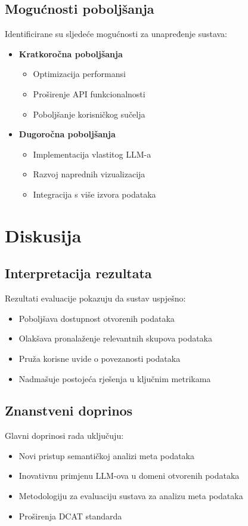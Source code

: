 \subsection{Mogućnosti poboljšanja}
Identificirane su sljedeće mogućnosti za unapređenje sustava:

\begin{itemize}
    \item \textbf{Kratkoročna poboljšanja}
    \begin{itemize}
        \item Optimizacija performansi
        \item Proširenje API funkcionalnosti
        \item Poboljšanje korisničkog sučelja
    \end{itemize}
    
    \item \textbf{Dugoročna poboljšanja}
    \begin{itemize}
        \item Implementacija vlastitog LLM-a
        \item Razvoj naprednih vizualizacija
        \item Integracija s više izvora podataka
    \end{itemize}
\end{itemize}

\section{Diskusija}
\label{sec:discussion}

\subsection{Interpretacija rezultata}
Rezultati evaluacije pokazuju da sustav uspješno:
\begin{itemize}
    \item Poboljšava dostupnost otvorenih podataka
    \item Olakšava pronalaženje relevantnih skupova podataka
    \item Pruža korisne uvide o povezanosti podataka
    \item Nadmašuje postojeća rješenja u ključnim metrikama
\end{itemize}

\subsection{Znanstveni doprinos}
Glavni doprinosi rada uključuju:
\begin{itemize}
    \item Novi pristup semantičkoj analizi meta podataka
    \item Inovativnu primjenu LLM-ova u domeni otvorenih podataka
    \item Metodologiju za evaluaciju sustava za analizu meta podataka
    \item Proširenja DCAT standarda
\end{itemize}

